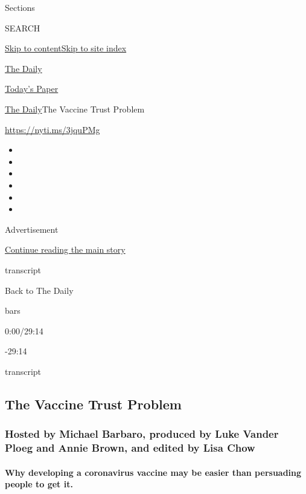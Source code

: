 Sections

SEARCH

\protect\hyperlink{site-content}{Skip to
content}\protect\hyperlink{site-index}{Skip to site index}

\href{https://www.nytimes.com/podcasts/the-daily}{The Daily}

\href{https://myaccount.nytimes.com/auth/login?response_type=cookie\&client_id=vi}{}

\href{https://www.nytimes.com/section/todayspaper}{Today's Paper}

\href{/podcasts/the-daily}{The Daily}\textbar{}The Vaccine Trust Problem

\url{https://nyti.ms/3jquPMg}

\begin{itemize}
\item
\item
\item
\item
\item
\item
\end{itemize}

Advertisement

\protect\hyperlink{after-top}{Continue reading the main story}

transcript

Back to The Daily

bars

0:00/29:14

-29:14

transcript

\hypertarget{the-vaccine-trust-problem}{%
\subsection{The Vaccine Trust Problem}\label{the-vaccine-trust-problem}}

\hypertarget{hosted-by-michael-barbaro-produced-by-luke-vander-ploeg-and-annie-brown-and-edited-by-lisa-chow}{%
\subsubsection{Hosted by Michael Barbaro, produced by Luke Vander Ploeg
and Annie Brown, and edited by Lisa
Chow}\label{hosted-by-michael-barbaro-produced-by-luke-vander-ploeg-and-annie-brown-and-edited-by-lisa-chow}}

\hypertarget{why-developing-a-coronavirus-vaccine-may-be-easier-than-persuading-people-to-get-it}{%
\paragraph{Why developing a coronavirus vaccine may be easier than
persuading people to get
it.}\label{why-developing-a-coronavirus-vaccine-may-be-easier-than-persuading-people-to-get-it}}

